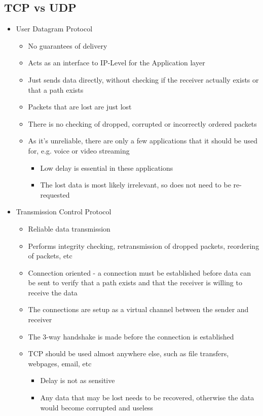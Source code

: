 
\subsection*{TCP vs UDP}

\begin{itemize}
  \item User Datagram Protocol
  \begin{itemize}
    \item No guarantees of delivery
    \item Acts as an interface to IP-Level for the Application layer
    \item Just sends data directly, without checking if the receiver actually exists or that a path exists
    \item Packets that are lost are just lost
    \item There is no checking of dropped, corrupted or incorrectly ordered packets
    \item As it's unreliable, there are only a few applications that it should be used for, e.g. voice or video streaming
    \begin{itemize}
      \item Low delay is essential in these applications
      \item The lost data is most likely irrelevant, so does not need to be re-requested
    \end{itemize}
  \end{itemize}
  \item Transmission Control Protocol
  \begin{itemize}
    \item Reliable data transmission
    \item Performs integrity checking, retransmission of dropped packets, reordering of packets, etc
    \item Connection oriented - a connection must be established before data can be sent to verify that a path exists and that the receiver is willing to receive the data
    \item The connections are setup as a virtual channel between the sender and receiver
    \item The 3-way handshake is made before the connection is established
    \item TCP should be used almost anywhere else, such as file transfers, webpages, email, etc
    \begin{itemize}
      \item Delay is not as sensitive
      \item Any data that may be lost needs to be recovered, otherwise the data would become corrupted and useless
    \end{itemize}
  \end{itemize}
\end{itemize}

